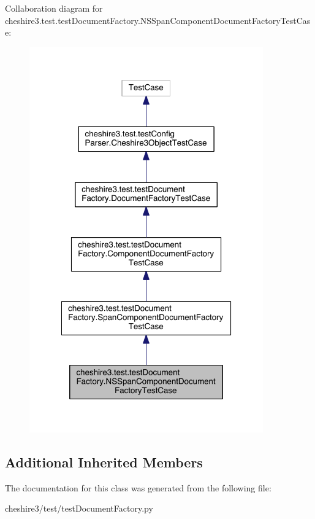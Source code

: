 Collaboration diagram for cheshire3.\-test.\-test\-Document\-Factory.\-N\-S\-Span\-Component\-Document\-Factory\-Test\-Case\-:
\nopagebreak
\begin{figure}[H]
\begin{center}
\leavevmode
\includegraphics[width=286pt]{classcheshire3_1_1test_1_1test_document_factory_1_1_n_s_span_component_document_factory_test_case__coll__graph}
\end{center}
\end{figure}
\subsection*{Additional Inherited Members}


The documentation for this class was generated from the following file\-:\begin{DoxyCompactItemize}
\item 
cheshire3/test/test\-Document\-Factory.\-py\end{DoxyCompactItemize}

